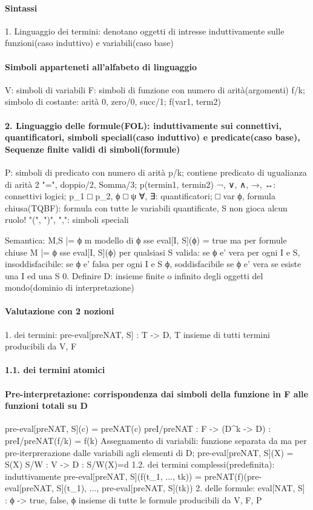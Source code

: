 \documentclass[12pt]{article}
\begin{document}
\paragraph{Sintassi}
	1. Linguaggio dei termini: denotano oggetti di intresse induttivamente sulle funzioni(caso induttivo) e variabili(caso base)
\paragraph{Simboli apparteneti all'alfabeto di linguaggio}
		V: simboli di variabili
		F: simboli di funzione con numero di arità(argomenti) f/k; simbolo di costante: arità 0, zero/0, succ/1; f(var1, term2) 

\paragraph{2. Linguaggio delle formule(FOL): induttivamente sui connettivi, quantificatori, simboli speciali(caso induttivo) e predicate(caso base), Sequenze finite validi di simboli(formule)}
		P: simboli di predicato con numero di arità p/k; contiene predicato di ugualianza di arità 2 "=", doppio/2, Somma/3; p(termin1, termin2)
		{¬, ∨, ∧, →, ↔}: connettivi logici; p_1 □ p_2, ϕ □ ψ 
		{∀, ∃}: quantificatori; □ var ϕ, formula chiusa(TQBF): formula con tutte le variabili quantificate, S non gioca alcun ruolo!
		{"(", ")", ","}: simboli speciali

Semantica: M,S |= ϕ m modello di ϕ sse eval[I, S](ϕ) = true ma per formule chiuse M |= ϕ sse eval[I, S](ϕ) per qualsiasi S	
	valida: se ϕ e' vera per ogni I e S, insoddisfacibile: se ϕ e' falsa per ogni I e S ϕ, soddisfacibile se ϕ e' vera se esiste una I ed una S
		0. Definire D: insieme finite o infinito degli oggetti del mondo(dominio di interpretazione)
\paragraph{Valutazione con 2 nozioni}
		1. dei termini: pre-eval[preNAT, S] : T -> D, T insieme di tutti termini producibili da V, F
\paragraph{1.1. dei termini atomici}
\paragraph{Pre-interpretazione: corrispondenza dai simboli della funzione in F alle funzioni totali su D}
					pre-eval[preNAT, S](c) = preNAT(c)
					preI/preNAT : F -> (D^k -> D) : preI/preNAT(f/k) = f(k)
				Assegnamento di variabili: funzione separata da ma per pre-iterprerazione dalle variabili agli elementi di D;
					pre-eval[preNAT, S](X) = S(X)
					S/W : V -> D : S/W(X)=d
			1.2. dei termini complessi(predefinita): induttivamente
					pre-eval[preNAT, S](f(t_1, ..., tk)) = preNAT(f)(pre-eval[preNAT, S](t_1), ..., pre-eval[preNAT, S](tk))
		2. delle formule: eval[NAT, S] : ϕ -> {true, false}, ϕ insieme di tutte le formule producibili da V, F, P
\end{document}
